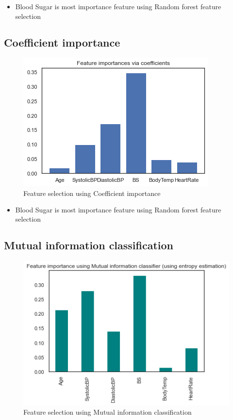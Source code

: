\documentclass[12pt, letter]{article}
\begin{document}
\noindent
\begin{itemize}
    \item Blood Sugar is most importance feature using Random forest feature selection
\end{itemize}

\pagebreak

\noindent
\subsection{Coefficient importance}
\begin{figure}[h]
    \centering
    \includegraphics[scale = 0.7]{coef_imp.png}
    \caption{Feature selection using Coefficient importance}
    \label{FS_RF}
\end{figure}

\noindent
\begin{itemize}
    \item Blood Sugar is most importance feature using Random forest feature selection 
\end{itemize}


\noindent
\subsection{Mutual information classification}
\begin{figure}[h]
    \centering
    \includegraphics[scale = 0.7]{FS_entropy.png}
    \caption{Feature selection using Mutual information classification}
    \label{FS_entropy}
\end{figure}
\end{document}
